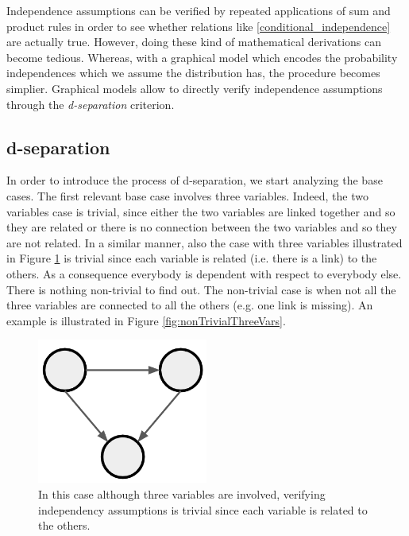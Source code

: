 Independence assumptions can be verified by repeated applications of sum and
product rules in order to see whether relations like
\ref{conditional_independence} are actually true. However, doing these kind of
mathematical derivations can become tedious. Whereas, with a graphical model
which encodes the probability independences which we assume the distribution has,
the procedure becomes simplier. Graphical models allow to directly verify
independence assumptions through the \textit{d-separation} criterion.

\subsection{d-separation}
In order to introduce the process of d-separation, we start analyzing the base
cases. The first relevant base case involves three variables. Indeed, the two variables
case is trivial, since either the two variables are linked together and so they
are related or there is no connection between the two variables and so they are
not related. In a similar manner, also the case with three variables illustrated
in Figure \ref{fig:trivialDSeparationThreeVariable} is trivial since each
variable is related (i.e. there is a link) to the others. As a consequence
everybody is dependent with respect to everybody else. There is nothing non-trivial
to find out. The non-trivial case is when not all the three variables are
connected to all the others (e.g. one link is missing). An example is
illustrated in Figure \ref{fig:nonTrivialThreeVars}.

\begin{figure}[H]
	\centering
	\includegraphics[width=0.5\textwidth]{
		images/08_BayesianNetworks_exampleTrivialBayesianNetwork.png
	}
	\caption{In this case although three variables are involved, verifying independency
	assumptions is trivial since each variable is related to the others.}
	\label{fig:trivialDSeparationThreeVariable}
\end{figure}

